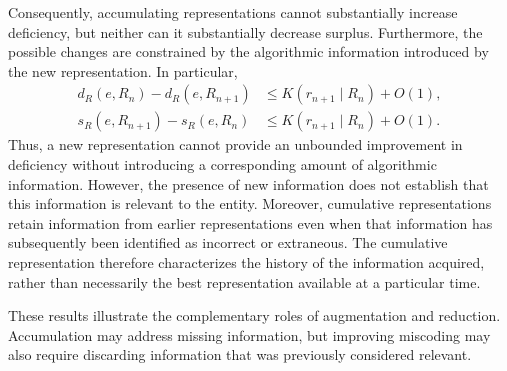 Consequently, accumulating representations cannot substantially increase deficiency, but neither can it substantially decrease surplus. Furthermore, the possible changes are constrained by the algorithmic information introduced by the new representation. In particular,
\[
\begin{aligned}
d_R(e,R_n)-d_R(e,R_{n+1})
&\le K(r_{n+1}\mid R_n)+O(1),\\
s_R(e,R_{n+1})-s_R(e,R_n)
&\le K(r_{n+1}\mid R_n)+O(1).
\end{aligned}
\]
Thus, a new representation cannot provide an unbounded improvement in deficiency without introducing a corresponding amount of algorithmic information. However, the presence of new information does not establish that this information is relevant to the entity. Moreover, cumulative representations retain information from earlier representations even when that information has subsequently been identified as incorrect or extraneous. The cumulative representation therefore characterizes the history of the information acquired, rather than necessarily the best representation available at a particular time.

These results illustrate the complementary roles of augmentation and reduction. Accumulation may address missing information, but improving miscoding may also require discarding information that was previously considered relevant.

